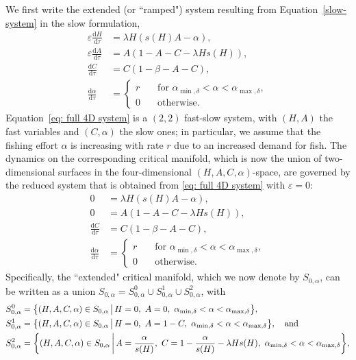 \documentclass{article}
\theoremstyle{definition}
\numberwithin{equation}{section}
\newcommand{\dd}{\mathrm{d}}
\begin{document}
We first write the extended (or ``ramped") system resulting from Equation~\eqref{slow-system} in the slow formulation,
\begin{equation}
\begin{split}
    \varepsilon \frac{\dd H}{\dd \tau} &= \lambda H(s(H)A-\alpha), \\
    \varepsilon \frac{\dd A}{\dd \tau} &= A(1-A-C-\lambda Hs(H)), \\
    \frac{\dd C}{\dd \tau} &= C(1-\beta-A-C),\\
    \frac{\dd \alpha}{\dd \tau} &=\begin{cases}
        r & \quad\text{for }\alpha_{\min,\delta}< \alpha < \alpha_{\max,\delta},\\
        0 & \quad \text{otherwise}.
    \end{cases}
\end{split}
\label{eq: full 4D system}
\end{equation}
Equation~\eqref{eq: full 4D system} is a $(2,2)$ fast-slow system, with $(H,A)$ the fast variables and $(C,\alpha)$ the slow ones; in particular, we assume that the fishing effort $\alpha$ is increasing with rate $r$ due to an increased demand for fish.
The dynamics on the corresponding critical manifold, which is now the union of two-dimensional surfaces in the four-dimensional $(H,A,C,\alpha)$-space, are governed by the reduced system that is obtained from \eqref{eq: full 4D system} with $\varepsilon=0$:
\begin{align}
    0 &= \lambda H(s(H)A-\alpha)\label{eq: crit manifold 1}, \\
    0 &= A(1-A-C-\lambda Hs(H))\label{eq: crit manifold 2}, \\
    \frac{\dd C}{\dd \tau} &= C(1-\beta-A-C),\\
    \frac{\dd \alpha}{\dd \tau} &=\begin{cases}
        r & \quad\text{for } \alpha_{\min,\delta}< \alpha < \alpha_{\max,\delta},\\
        0 & \quad \mathrm{otherwise}.
    \end{cases}
\end{align}
Specifically, the ``extended" critical manifold, which we now denote by $S_{0,\alpha}$, can be written as a union
$S_{0,\alpha}=S_{0,\alpha}^0\cup S_{0,\alpha}^1\cup S^2_{0,\alpha}$, with
\begin{align}
    &S_{0,\alpha}^0 = \big\{(H,A,C,\alpha)\in S_{0,\alpha}\,\big|\, H=0,\ A=0,\ \alpha_{{\rm min},\delta}< \alpha < \alpha_{{\rm max},\delta}\big\}, \\ 
    &S_{0,\alpha}^1 =\big\{(H,A,C,\alpha)\in S_{0,\alpha}\,\big|\, H=0,\ A=1-C,\ \alpha_{{\rm min},\delta}< \alpha < \alpha_{{\rm max},\delta}\big\}, \quad\text{and} \\
    &S_{0,\alpha}^2 = \bigg\{(H,A,C,\alpha)\in S_{0,\alpha}\,\bigg|\,  A = \frac{\alpha}{s(H)},\ C=1-\frac{\alpha}{s(H)}-\lambda Hs(H),\ \alpha_{{\rm min},\delta}< \alpha < \alpha_{{\rm max},\delta}\bigg\}\label{eq: S^2_0 def},
\end{align}
\end{document}
